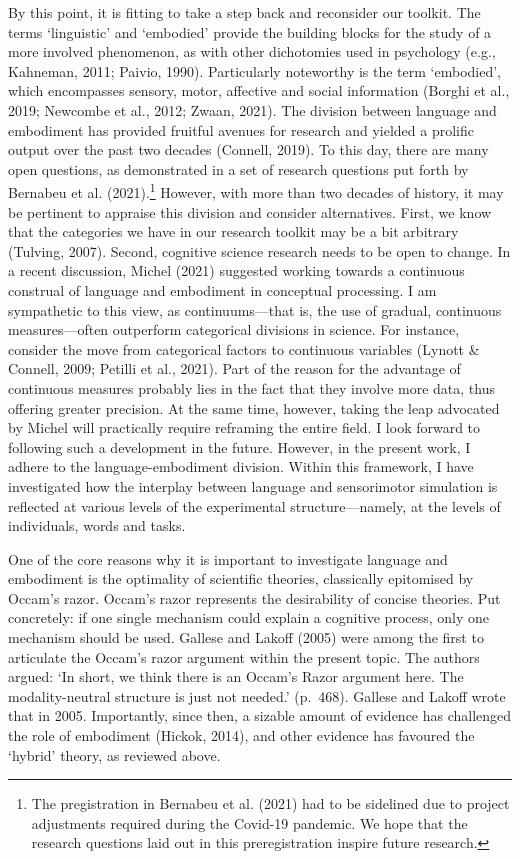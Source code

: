 \documentclass[
  12pt,
  man,floatsintext]{apa7}
\begin{document}
By this point, it is fitting to take a step back and reconsider our toolkit. The terms `linguistic' and `embodied' provide the building blocks for the study of a more involved phenomenon, as with other dichotomies used in psychology (e.g., Kahneman, 2011; Paivio, 1990). Particularly noteworthy is the term `embodied', which encompasses sensory, motor, affective and social information (Borghi et al., 2019; Newcombe et al., 2012; Zwaan, 2021). The division between language and embodiment has provided fruitful avenues for research and yielded a prolific output over the past two decades (Connell, 2019). To this day, there are many open questions, as demonstrated in a set of research questions put forth by Bernabeu et al. (2021).\footnote{The pregistration in Bernabeu et al. (2021) had to be sidelined due to project adjustments required during the Covid-19 pandemic. We hope that the research questions laid out in this preregistration inspire future research.} However, with more than two decades of history, it may be pertinent to appraise this division and consider alternatives. First, we know that the categories we have in our research toolkit may be a bit arbitrary (Tulving, 2007). Second, cognitive science research needs to be open to change. In a recent discussion, Michel (2021) suggested working towards a continuous construal of language and embodiment in conceptual processing. I am sympathetic to this view, as continuums---that is, the use of gradual, continuous measures---often outperform categorical divisions in science. For instance, consider the move from categorical factors to continuous variables (Lynott \& Connell, 2009; Petilli et al., 2021). Part of the reason for the advantage of continuous measures probably lies in the fact that they involve more data, thus offering greater precision. At the same time, however, taking the leap advocated by Michel will practically require reframing the entire field. I look forward to following such a development in the future. However, in the present work, I adhere to the language-embodiment division. Within this framework, I have investigated how the interplay between language and sensorimotor simulation is reflected at various levels of the experimental structure---namely, at the levels of individuals, words and tasks.

One of the core reasons why it is important to investigate language and embodiment is the optimality of scientific theories, classically epitomised by Occam's razor. Occam's razor represents the desirability of concise theories. Put concretely: if one single mechanism could explain a cognitive process, only one mechanism should be used. Gallese and Lakoff (2005) were among the first to articulate the Occam's razor argument within the present topic. The authors argued: `In short, we think there is an Occam's Razor argument here. The modality-neutral structure is just not needed.' (p.~468). Gallese and Lakoff wrote that in 2005. Importantly, since then, a sizable amount of evidence has challenged the role of embodiment (Hickok, 2014), and other evidence has favoured the `hybrid' theory, as reviewed above.
\end{document}
